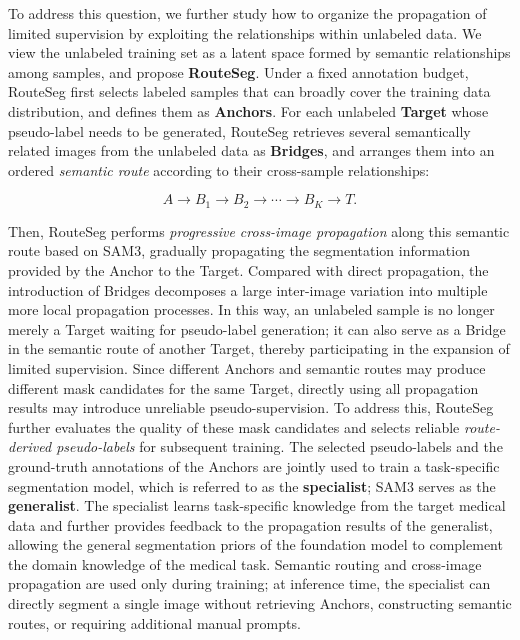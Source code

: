 \documentclass[a4paper,fleqn]{cas-dc}
\begin{document}
To address this question, we further study how to organize the propagation of limited supervision by exploiting the relationships within unlabeled data. We view the unlabeled training set as a latent space formed by semantic relationships among samples, and propose \textbf{RouteSeg}. Under a fixed annotation budget, RouteSeg first selects labeled samples that can broadly cover the training data distribution, and defines them as \textbf{Anchors}. For each unlabeled \textbf{Target} whose pseudo-label needs to be generated, RouteSeg retrieves several semantically related images from the unlabeled data as \textbf{Bridges}, and arranges them into an ordered \emph{semantic route} according to their cross-sample relationships:

\begin{equation}
A \rightarrow B_1 \rightarrow B_2 \rightarrow \cdots \rightarrow B_K \rightarrow T.
\end{equation}

Then, RouteSeg performs \emph{progressive cross-image propagation} along this semantic route based on SAM3, gradually propagating the segmentation information provided by the Anchor to the Target. Compared with direct propagation, the introduction of Bridges decomposes a large inter-image variation into multiple more local propagation processes. In this way, an unlabeled sample is no longer merely a Target waiting for pseudo-label generation; it can also serve as a Bridge in the semantic route of another Target, thereby participating in the expansion of limited supervision. Since different Anchors and semantic routes may produce different mask candidates for the same Target, directly using all propagation results may introduce unreliable pseudo-supervision. To address this, RouteSeg further evaluates the quality of these mask candidates and selects reliable \emph{route-derived pseudo-labels} for subsequent training. The selected pseudo-labels and the ground-truth annotations of the Anchors are jointly used to train a task-specific segmentation model, which is referred to as the \textbf{specialist}; SAM3 serves as the \textbf{generalist}. The specialist learns task-specific knowledge from the target medical data and further provides feedback to the propagation results of the generalist, allowing the general segmentation priors of the foundation model to complement the domain knowledge of the medical task. Semantic routing and cross-image propagation are used only during training; at inference time, the specialist can directly segment a single image without retrieving Anchors, constructing semantic routes, or requiring additional manual prompts.
\end{document}
